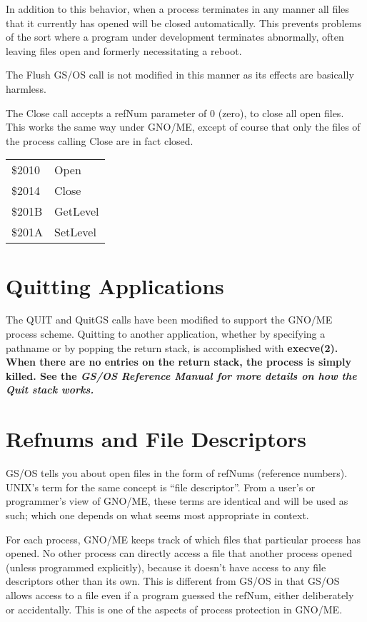 \documentclass{report}
\begin{document}
In addition to this behavior, when a
process terminates in any manner all files that it currently has
opened will be closed automatically. This prevents problems of
the sort where a program under development terminates abnormally,
often leaving files open and formerly necessitating a reboot.

The Flush GS/OS call is not modified in
this manner as its effects are basically harmless.

The Close call accepts a refNum parameter
of 0 (zero), to close all open files. This works the same way
under GNO/ME, except of course that only the files of the process
calling Close are in fact closed.

\begin{tabular}{ll}
\$2010 & Open \\
\$2014 & Close \\
\$201B & GetLevel \\
\$201A & SetLevel \\
\end{tabular}

\section{Quitting Applications}

The QUIT and QuitGS calls have been
modified to support the GNO/ME process scheme. Quitting to
another application, whether by specifying a pathname or by
popping the return stack, is accomplished with \bf execve\rm(2).
When there are no entries on the return stack, the process is
simply killed. See the \it GS/OS Reference Manual \rm for more
details on how the Quit stack works.

\section{Refnums and File Descriptors}

GS/OS tells you about open files in the
form of refNums (reference numbers). UNIX's term for the same
concept is ``file descriptor''. From a user's or programmer's view
of GNO/ME, these terms are identical and will be used as such;
which one depends on what seems most appropriate in context.

For each process, GNO/ME keeps track of
which files that particular process has opened. No other process
can directly access a file that another process opened (unless
programmed explicitly), because it doesn't have access to any
file descriptors other than its own. This is different from GS/OS
in that GS/OS allows access to a file even if a program guessed
the refNum, either deliberately or accidentally. This is one of
the aspects of process protection in GNO/ME.
\end{document}

